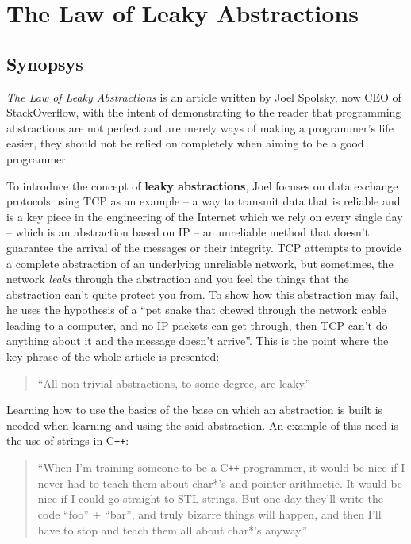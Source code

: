 \documentclass[compilation.tex]{subfiles}
\newcommand{\cplusplus}{C\texttt{++}}
\begin{document}
\section{The Law of Leaky Abstractions}

\subsection{Synopsys}

\textit{The Law of Leaky Abstractions}\supercite{main-spolsky}
is an article written by Joel Spolsky, now CEO of StackOverflow, with the intent of demonstrating to the reader that programming abstractions are not perfect and are merely ways of making a programmer’s life easier, they should not be relied on completely when aiming to be a good programmer.

To introduce the concept of \textbf{leaky abstractions}, Joel focuses on data exchange protocols using TCP as an example -- a way to transmit data that is reliable and is a key piece in the engineering of the Internet which we rely on every single day -- which is an abstraction based on IP -- an unreliable method that doesn't guarantee the arrival of the messages or their integrity.
TCP attempts to provide a complete abstraction of an underlying unreliable network, but sometimes, the network \emph{leaks} through the abstraction and you feel the things that the abstraction can’t quite protect you from.
To show how this abstraction may fail, he uses the hypothesis of a “pet snake that chewed through the network cable leading to a computer, and no IP packets can get through, then TCP can’t do anything about it and the message doesn’t arrive”.
This is the point where the key phrase of the whole article is presented:

\begin{quote}
\large ``All non-trivial abstractions, to some degree, are leaky.''
\end{quote}

Learning how to use the basics of the base on which an abstraction is built is needed when learning and using the said abstraction.
An example of this need is the use of strings in \cplusplus{}:

\begin{quote}
``When I’m training someone to be a \cplusplus{} programmer, it would be nice if I never had to teach them about char*’s and pointer arithmetic.
It would be nice if I could go straight to STL strings.
But one day they’ll write the code “foo” + “bar”, and truly bizarre things will happen, and then I’ll have to stop and teach them all about char*’s anyway.''
\end{quote}
\end{document}

